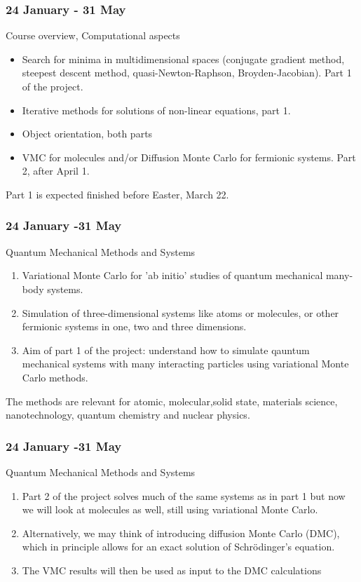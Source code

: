 \documentclass[compress]{beamer}
\begin{document}
\frame
{
  \frametitle{24 January - 31  May}
  \begin{block}{Course overview, Computational aspects}
\begin{itemize}
\item Search for minima in multidimensional spaces (conjugate gradient method, steepest descent method, quasi-Newton-Raphson, Broyden-Jacobian). Part 1 of the project.
\item Iterative methods for solutions of non-linear equations, part 1.
\item Object orientation, both parts
\item VMC for molecules and/or Diffusion Monte Carlo for fermionic systems. Part 2, after April 1.
\end{itemize}
Part 1 is expected finished before Easter, March 22.
  \end{block}
} 





\frame
{
  \frametitle{24 January -31 May}
  \begin{block}{Quantum Mechanical Methods and Systems}
\begin{enumerate}
\item Variational Monte Carlo for 'ab initio' studies of quantum mechanical many-body systems.
\item Simulation of three-dimensional systems like atoms or molecules, or other fermionic systems in one, two and three dimensions. 
\item Aim of part 1 of the project: understand how to simulate qauntum mechanical systems with many interacting particles using variational Monte Carlo methods.
\end{enumerate}
The methods are relevant for 
atomic, molecular,solid state, materials science, nanotechnology, quantum chemistry  and nuclear physics. 

  \end{block}
} 


\frame
{
  \frametitle{24 January -31 May}
  \begin{block}{Quantum Mechanical Methods and Systems}
\begin{enumerate}
\item Part 2 of the project solves much of the same systems as in part 1 but 
now we will look at molecules as well, still using variational Monte Carlo.
\item Alternatively, we may think of 
introducing diffusion Monte Carlo (DMC), which in principle allows for an exact solution of Schr\"odinger's equation.
\item The VMC results will then  be used as input to the DMC calculations 
\end{enumerate}
  \end{block}
} 
\end{document}
